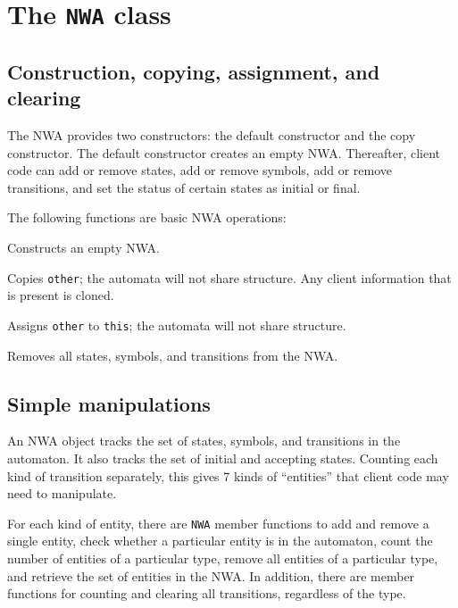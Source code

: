 \section{The \texttt{NWA} class}
\label{Se:NWA-class}

\subsection{Construction, copying, assignment, and clearing}
\label{Se:Construction}

The NWA provides two constructors: the default constructor and the copy
constructor. The default constructor creates an empty NWA. Thereafter,
client code can add or remove states, add or remove symbols, add or remove
transitions, and set the status of certain states as initial or final.


The following functions are basic NWA operations:
\begin{functionlist}
    Constructs an empty NWA.

    Copies \texttt{other}; the
    automata will not share structure. Any client information that is present is cloned.

    Assigns \texttt{other} to \texttt{this};
    the automata will not share structure.

    Removes all states, symbols, and transitions from the NWA.

\end{functionlist}


\subsection{Simple manipulations}

An NWA object tracks the set of states, symbols, and transitions in the
automaton. It also tracks the set of initial and accepting states.
Counting each kind of transition separately, this gives 7 kinds of
``entities'' that client code may need to manipulate.

For each kind of entity, there are \texttt{NWA} member functions to add and
remove a single entity, check whether a particular entity is in the
automaton, count the number of entities of a particular type, remove all
entities of a particular type, and retrieve the set of entities in the
NWA. In addition, there are member functions for counting and clearing all
transitions, regardless of the type.

